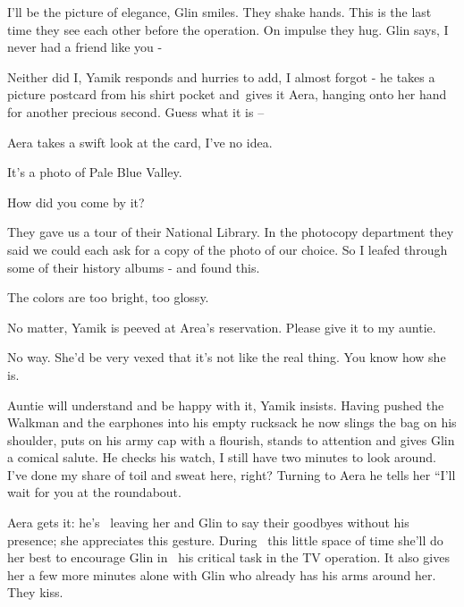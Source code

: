\documentclass[letterpaper]{article}
\begin{document}
{\textquotedbl}I'll be the picture of elegance,{\textquotedbl} Glin smiles. They shake hands. This is the last time they
see each other before the operation. On impulse they hug. Glin says, {\textquotedbl}I never had a friend like you
-{\textquotedbl} 

{\textquotedbl}Neither did I,{\textquotedbl} Yamik responds and hurries to add, {\textquotedbl}I almost forgot
-{\textquotedbl} he takes a picture postcard from his shirt pocket and~gives it Aera, hanging onto her hand for another
precious second. {\textquotedbl}Guess what it is --{\textquotedbl} 

Aera takes a swift look at{ }the card, {\textquotedbl}I've no idea.{\textquotedbl} 

{\textquotedbl}It's a photo of Pale Blue Valley.{\textquotedbl} 

{\textquotedbl}How did you come by it?{\textquotedbl} 

{\textquotedbl}They gave us a tour of their National Library. In the photocopy department they said we could each ask
for a copy of the photo of our choice. So I leafed through some of their history albums - and found
this.{\textquotedbl} 

{\textquotedbl}The colors are too bright, too glossy.{\textquotedbl} 

{\textquotedbl}No matter,{\textquotedbl} Yamik is peeved at Area's reservation. {\textquotedbl}Please give it to my
auntie.{\textquotedbl} 

{\textquotedbl}No way. She'd be very vexed that it's not like the real thing. You know how she is.{\textquotedbl} 

{\textquotedbl}Auntie will understand and be happy with it,{\textquotedbl} Yamik insists. Having pushed the Walkman and
the earphones into his empty rucksack he now slings the bag on his shoulder, puts on his army cap with a flourish,
stands to attention and gives Glin a comical salute. He checks his watch, {\textquotedbl}I still have two minutes to
look around. I've done my share of toil and sweat here, right?{\textquotedbl} Turning to Aera he tells her ``I'll wait
for you at the roundabout.{\textquotedbl}

Aera gets it: he's \ leaving her and Glin to say their goodbyes without his presence; she appreciates this gesture.
During \ this little space of time she'll do her best to encourage Glin in \ his critical task in the TV operation. It
also gives her a few more minutes alone with Glin who already has his arms around her. They kiss. 
\end{document}
